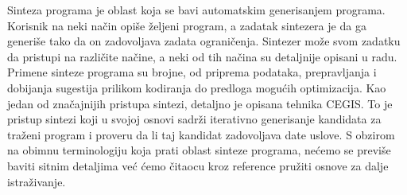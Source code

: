 \abstract

Sinteza programa je oblast koja se bavi automatskim generisanjem programa. Korisnik na neki način opiše željeni program, a zadatak sintezera je da ga generiše tako da on zadovoljava zadata ograničenja. Sintezer može svom zadatku da pristupi na različite načine, a neki od tih načina su detaljnije opisani u radu. Primene sinteze programa su brojne, od priprema podataka, prepravljanja i dobijanja sugestija prilikom kodiranja do predloga mogućih optimizacija. Kao jedan od značajnijih pristupa sintezi, detaljno je opisana tehnika CEGIS. To je pristup sintezi koji u svojoj osnovi sadrži iterativno generisanje kandidata za traženi program i proveru da li taj kandidat zadovoljava date uslove. S obzirom na obimnu terminologiju koja prati oblast sinteze programa, nećemo se previše baviti sitnim detaljima već ćemo čitaocu kroz reference pružiti osnove za dalje istraživanje.
